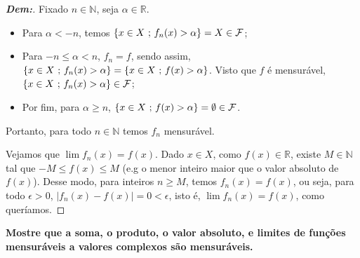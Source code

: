 \begin{proof}[\textbf{Dem:}] Fixado $n \in \mathbb N$, seja $\alpha \in \mathbb R$. 

\begin{itemize}
  \item Para $\alpha < -n$, temos $\{x \in X\text{ ; }  f_n(x) > \alpha\}
  = X \in \mathcal F$;
  \item   Para $-n \le \alpha < n$, $f_n = f$, sendo assim, $\{x \in X\text{ ; }  f_n(x) > \alpha\} = 
    \{x \in X\text{ ; }  f(x) > \alpha\}$. Visto que $f$ é mensurável, 
    $\{x \in X\text{ ; }  f_n(x) > \alpha\} \in \mathcal F$;
  \item Por fim, para $\alpha \ge n$, $\{x \in X\text{ ; }  f(x) > \alpha\} = \emptyset \in \mathcal F$.
\end{itemize}
Portanto, para todo $n \in \mathbb N$ temos $f_n$ mensurável. 

Vejamos que $\lim f_n(x) = f(x)$.
Dado $x \in X$, como $f(x) \in \mathbb R$, existe $M \in \mathbb N$ tal que $-M\le f(x)\le M$ 
(e.g o menor inteiro maior que o valor absoluto de $f(x)$).
Desse modo, para inteiros $n \ge M$, temos $f_n(x) = f(x)$, 
ou seja, para todo $\epsilon > 0$, $|f_n(x) - f(x)| = 0 < \epsilon$, 
isto é, $\lim f_n (x) = f(x)$, como queríamos.
\end{proof}
\biglinend
\newpage 
{}
\bigline 
\textbf{Mostre que a soma, o produto, o valor absoluto, e limites de funções mensuráveis
a valores complexos são mensuráveis.}
